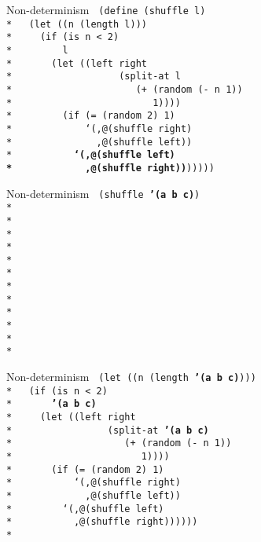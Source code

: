 \begin{frame}{Non-determinism}
  \texttt{
    (define (shuffle l)\\*
    \ \ (let ((n (length l)))\\*
    \ \ \ \ (if (is n < 2)\\*
    \ \ \ \ \ \ \ \ l\\*
    \ \ \ \ \ \ (let ((left right\\*
    \ \ \ \ \ \ \ \ \ \ \ \ \ \ \ \ \ \ (split-at l\\*
    \ \ \ \ \ \ \ \ \ \ \ \ \ \ \ \ \ \ \ \ \ (+ (random (- n 1))\\*
    \ \ \ \ \ \ \ \ \ \ \ \ \ \ \ \ \ \ \ \ \ \ \ \ 1))))\\*
    \ \ \ \ \ \ \ \ (if (= (random 2) 1)\\*
    \ \ \ \ \ \ \ \ \ \ \ \ `(,@(shuffle right)\\*
    \ \ \ \ \ \ \ \ \ \ \ \ \ \ ,@(shuffle left))\\*
    \ \ \ \ \ \ \ \ \ \ \textbf{`(,@(shuffle left)\\*
    \ \ \ \ \ \ \ \ \ \ \ \ ,@(shuffle right))})))))
    }
\end{frame}

\begin{frame}{Non-determinism}
  \texttt{
    (shuffle \textbf{'(a b c)})\\*
    \ \\*
    \ \\*
    \ \\*
    \ \\*
    \ \\*
    \ \\*
    \ \\*
    \ \\*
    \ \\*
    \ \\*
    \ \\*
    \ 
    }
\end{frame}

\begin{frame}{Non-determinism}
  \texttt{
    (let ((n (length \textbf{'(a b c)})))\\*
    \ \ (if (is n < 2)\\*
    \ \ \ \ \ \ \textbf{'(a b c)}\\*
    \ \ \ \ (let ((left right\\*
    \ \ \ \ \ \ \ \ \ \ \ \ \ \ \ \ (split-at \textbf{'(a b c)}\\*
    \ \ \ \ \ \ \ \ \ \ \ \ \ \ \ \ \ \ \ (+ (random (- n 1))\\*
    \ \ \ \ \ \ \ \ \ \ \ \ \ \ \ \ \ \ \ \ \ \ 1))))\\*
    \ \ \ \ \ \ (if (= (random 2) 1)\\*
    \ \ \ \ \ \ \ \ \ \ `(,@(shuffle right)\\*
    \ \ \ \ \ \ \ \ \ \ \ \ ,@(shuffle left))\\*
    \ \ \ \ \ \ \ \ `(,@(shuffle left)\\*
    \ \ \ \ \ \ \ \ \ \ ,@(shuffle right))))))\\*
    \ 
    }
\end{frame}


